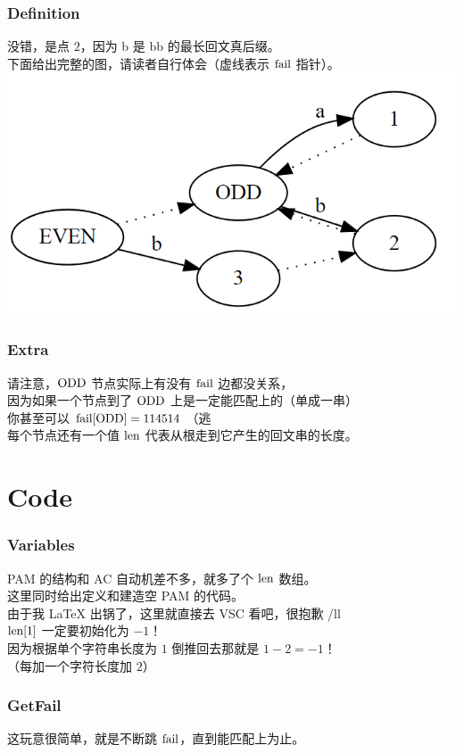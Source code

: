 \documentclass{beamer}
\begin{document}
\begin{CJK}{UTF8}{gbsn}
    \begin{frame}
        \frametitle{Definition}
		没错，是点 $2$，因为 b 是 bb 的最长回文真后缀。\\
		下面给出完整的图，请读者自行体会（虚线表示 $\rm fail$ 指针）。\\
		\includegraphics{2.PNG}
    \end{frame}
	
    \begin{frame}
        \frametitle{Extra}
		请注意，$\rm ODD$ 节点实际上有没有 $\rm fail$ 边都没关系，\\
		因为如果一个节点到了 $\rm ODD$ 上是一定能匹配上的（单成一串）\\
		你甚至可以 $\rm fail[ODD] = 114514$ （逃\\
		每个节点还有一个值 $\rm len$ 代表从根走到它产生的回文串的长度。  
    \end{frame}

	\section{Code}
	\begin{frame}
		\frametitle{Variables}
		PAM 的结构和 AC 自动机差不多，就多了个 $\rm len$ 数组。\\
		这里同时给出定义和建造空 PAM 的代码。\\
		由于我 LaTeX 出锅了，这里就直接去 VSC 看吧，很抱歉 /ll\\
		$\rm len[1]$ 一定要初始化为 $-1$！\\
		因为根据单个字符串长度为 $1$ 倒推回去那就是 $1-2=-1$！\\
		（每加一个字符长度加 $2$）
	\end{frame}

	\begin{frame}
		\frametitle{GetFail}
		这玩意很简单，就是不断跳 $\rm fail$，直到能匹配上为止。
	\end{frame}
	

\end{CJK}
\end{document}

